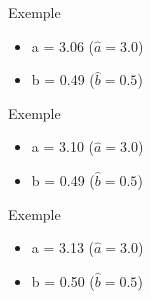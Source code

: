 \begin{frame}{Exemple}
  \begin{itemize}
    \item a = 3.06 ($\hat{a} = 3.0$)
    \item b = 0.49 ($\hat{b} = 0.5$)
  \end{itemize}
\end{frame}

\begin{frame}{Exemple}
  \begin{itemize}
    \item a = 3.10 ($\hat{a} = 3.0$)
    \item b = 0.49 ($\hat{b} = 0.5$)
  \end{itemize}
\end{frame}

\begin{frame}{Exemple}
  \begin{itemize}
    \item a = 3.13 ($\hat{a} = 3.0$)
    \item b = 0.50 ($\hat{b} = 0.5$)
  \end{itemize}
\end{frame}
